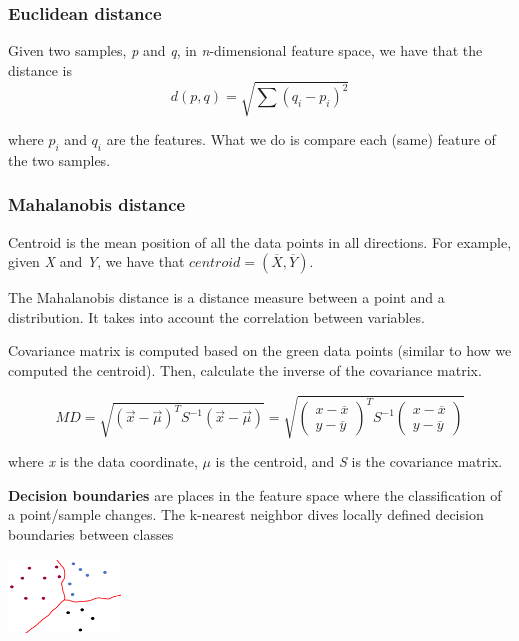 \documentclass{article}
\begin{document}
\subsubsection*{Euclidean distance}
Given two samples, \emph{p} and \emph{q}, in \emph{n}-dimensional feature space, we have that the distance is
\[d(p, q) = \sqrt{\sum (q_i - p_i)^2}\]

where \(p_i\) and \(q_i\) are the features. What we do is compare each (same) feature of the two samples.


\subsubsection*{Mahalanobis distance}
Centroid is the mean position of all the data points in all directions. For example, given \emph{X} and \emph{Y}, we have that \(centroid=(\overline{X}, \overline{Y})\).

The Mahalanobis distance is a distance measure between a point and a distribution. It takes into account the correlation between variables.



Covariance matrix is computed based on the green data points (similar to how we computed the centroid). Then, calculate the inverse of the covariance matrix.

\[MD = \sqrt{(\overrightarrow{x} - \overrightarrow{\mu})^TS^{-1} (\overrightarrow{x} - \overrightarrow{\mu})}  = \sqrt{\left(\begin{array}{c}
		x - \overline{x}\\
		y - \overline{y}
		\end{array}\right)^T S^{-1} \left(\begin{array}{c}
		x - \overline{x}\\
		y - \overline{y}
		\end{array}\right) }\]

where \emph{x} is the data coordinate, $\mu$ is the centroid, and \emph{S} is the covariance matrix.


\bigskip\bigskip


\begin{minipage}{0.65\linewidth}
\textbf{Decision boundaries} are places in the feature space where the classification of a point/sample changes. The k-nearest neighbor dives locally defined decision boundaries between classes
\end{minipage}
\hfill
\begin{minipage}{0.3\linewidth}
	\includegraphics[width=3cm, height=2cm]{img/decision_boundary.png}
\end{minipage}
\end{document}
